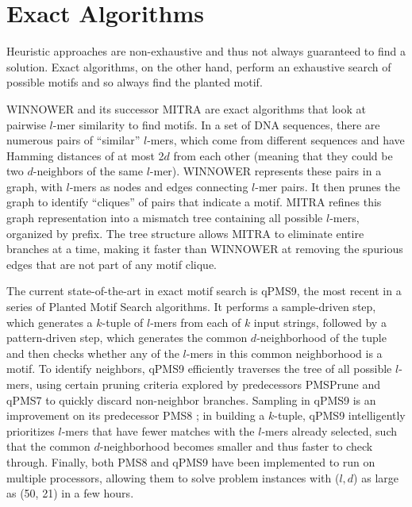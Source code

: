 \documentclass[oneside,12pt]{DISCSthesis}
\begin{document}
	\section{Exact Algorithms}
		Heuristic approaches are non-exhaustive and thus not always guaranteed to find a solution. Exact algorithms, on the other hand, perform an exhaustive search of possible motifs and so always find the planted motif.

		WINNOWER \cite{pevzner2000combinatorial} and its successor MITRA \cite{eskin2002finding} are exact algorithms that look at pairwise $l$-mer similarity to find motifs. In a set of DNA sequences, there are numerous pairs of ``similar'' $l$-mers, which come from different sequences and have Hamming distances of at most 2$d$ from each other (meaning that they could be two $d$-neighbors of the same $l$-mer). WINNOWER represents these pairs in a graph, with $l$-mers as nodes and edges connecting $l$-mer pairs. It then prunes the graph to identify ``cliques'' of pairs that indicate a motif. MITRA refines this graph representation into a mismatch tree containing all possible $l$-mers, organized by prefix. The tree structure allows MITRA to eliminate entire branches at a time, making it faster than WINNOWER at removing the spurious edges that are not part of any motif clique.

		The current state-of-the-art in exact motif search is qPMS9, the most recent in a series \cite{pms2007,pms2014,pms2015} of Planted Motif Search algorithms. It performs a sample-driven step, which generates a $k$-tuple of $l$-mers from each of $k$ input strings, followed by a pattern-driven step, which generates the common $d$-neighborhood of the tuple and then checks whether any of the $l$-mers in this common neighborhood is a motif. To identify neighbors, qPMS9 efficiently traverses the tree of all possible $l$-mers, using certain pruning criteria explored by predecessors PMSPrune and qPMS7 \cite{pms2007} to quickly discard non-neighbor branches. Sampling in qPMS9 is an improvement on its predecessor PMS8 \cite{pms2014}; in building a $k$-tuple, qPMS9 intelligently prioritizes $l$-mers that have fewer matches with the $l$-mers already selected, such that the common $d$-neighborhood becomes smaller and thus faster to check through.  Finally, both PMS8 and qPMS9 have been implemented to run on multiple processors, allowing them to solve problem instances with ($l, d$) as large as (50, 21) in a few hours.
\end{document}
